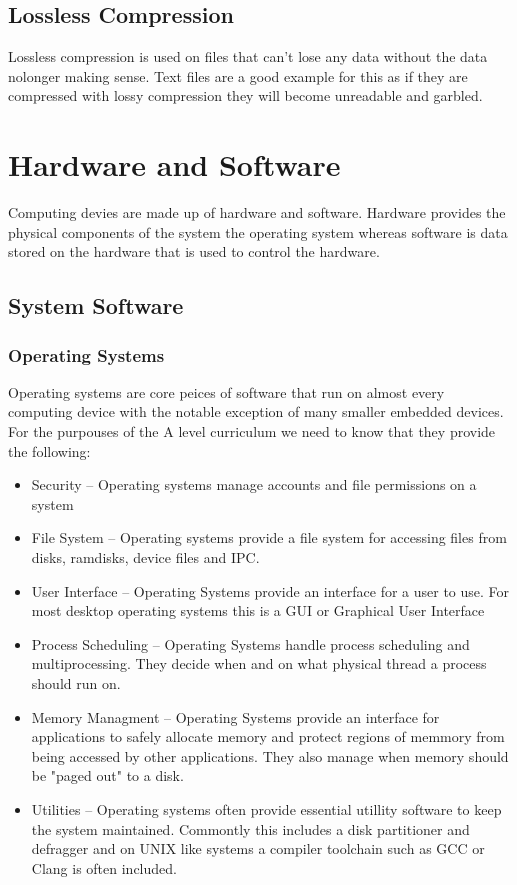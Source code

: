 \documentclass{article}
\begin{document}
\subsection{Lossless Compression}
Lossless compression is used on files that can't lose any data without the data nolonger making sense. Text files are a 
good example for this as if they are compressed with lossy compression they will become unreadable and garbled.

\section{Hardware and Software}
Computing devies are made up of hardware and software. Hardware provides the physical components of the system
the operating system whereas software is data stored on the hardware that is used to control the hardware.

\subsection{System Software}

\subsubsection{Operating Systems}
Operating systems are core peices of software that run on almost every computing device
with the notable exception of many smaller embedded devices. For the purpouses of the
A level curriculum we need to know that they provide the following:

\begin{itemize}
	\item Security -- Operating systems manage accounts and file permissions on a system
	\item File System -- Operating systems provide a file system for accessing files from disks, ramdisks, device files and IPC.
	\item User Interface -- Operating Systems provide an interface for a user to use. For most desktop operating systems this
    is a GUI or Graphical User Interface
    \item Process Scheduling -- Operating Systems handle process scheduling and multiprocessing. They decide when and on what
    physical thread a process should run on.
    \item Memory Managment -- Operating Systems provide an interface for applications to safely allocate memory and protect
    regions of memmory from being accessed by other applications. They also manage when memory should be "paged out" to a disk.
    \item Utilities -- Operating systems often provide essential utillity software to keep the system maintained. Commontly
    this includes a disk partitioner and defragger and on UNIX like systems a compiler toolchain such as GCC or Clang is
    often included.
\end{itemize}
\end{document}
